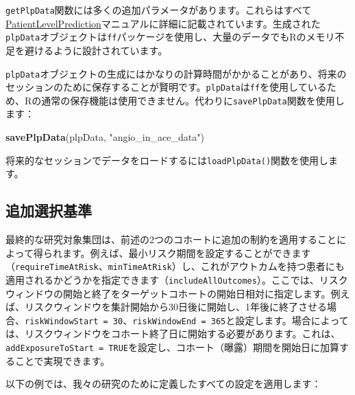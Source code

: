 \documentclass[
  11pt]{book}
\newenvironment{Shaded}{\begin{snugshade}}{\end{snugshade}}
\newcommand{\FunctionTok}[1]{\textcolor[rgb]{0.13,0.29,0.53}{\textbf{#1}}}
\newcommand{\NormalTok}[1]{#1}
\newcommand{\StringTok}[1]{\textcolor[rgb]{0.31,0.60,0.02}{#1}}
\theoremstyle{definition}
\theoremstyle{definition}
\theoremstyle{definition}
\theoremstyle{definition}
\theoremstyle{remark}
\begin{document}
\texttt{getPlpData}関数には多くの追加パラメータがあります。これらはすべて\href{https://ohdsi.github.io/PatientLevelPrediction/}{PatientLevelPrediction}マニュアルに詳細に記載されています。生成された\texttt{plpData}オブジェクトは\texttt{ff}パッケージを使用し、大量のデータでもRのメモリ不足を避けるように設計されています。

\texttt{plpData}オブジェクトの生成にはかなりの計算時間がかかることがあり、将来のセッションのために保存することが賢明です。\texttt{plpData}は\texttt{ff}を使用しているため、Rの通常の保存機能は使用できません。代わりに\texttt{savePlpData}関数を使用します：

\begin{Shaded}
\begin{Highlighting}[]
\FunctionTok{savePlpData}\NormalTok{(plpData, }\StringTok{"angio\_in\_ace\_data"}\NormalTok{)}
\end{Highlighting}
\end{Shaded}

将来的なセッションでデータをロードするには\texttt{loadPlpData()}関数を使用します。

\subsection{追加選択基準}\label{ux8ffdux52a0ux9078ux629eux57faux6e96}

最終的な研究対象集団は、前述の2つのコホートに追加の制約を適用することによって得られます。例えば、最小リスク期間を設定することができます（\texttt{requireTimeAtRisk}、\texttt{minTimeAtRisk}）し、これがアウトカムを持つ患者にも適用されるかどうかを指定できます（\texttt{includeAllOutcomes}）。ここでは、リスクウィンドウの開始と終了をターゲットコホートの開始日相対に指定します。例えば、リスクウィンドウを集計開始から30日後に開始し、1年後に終了させる場合、\texttt{riskWindowStart\ =\ 30}、\texttt{riskWindowEnd\ =\ 365}と設定します。場合によっては、リスクウィンドウをコホート終了日に開始する必要があります。これは、\texttt{addExposureToStart\ =\ TRUE}を設定し、コホート（曝露）期間を開始日に加算することで実現できます。

以下の例では、我々の研究のために定義したすべての設定を適用します：
\end{document}
